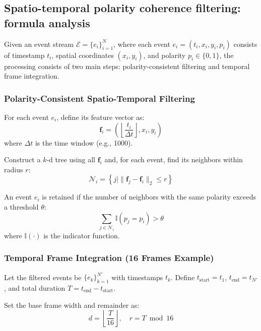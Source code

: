 \documentclass[conference]{IEEEtran}
\begin{document}
\subsection{Spatio-temporal polarity coherence filtering: formula analysis}
Given an event stream $\mathcal{E} = \{e_i\}_{i=1}^N$, where each event $e_i = (t_i, x_i, y_i, p_i)$ consists of timestamp $t_i$, spatial coordinates $(x_i, y_i)$, and polarity $p_i \in \{0, 1\}$, the processing consists of two main steps: polarity-consistent filtering and temporal frame integration.

\subsubsection{Polarity-Consistent Spatio-Temporal Filtering}

For each event $e_i$, define its feature vector as:
\begin{equation}
\mathbf{f}_i = \left( \left\lfloor \frac{t_i}{\Delta t} \right\rfloor, x_i, y_i \right)
\end{equation}
where $\Delta t$ is the time window (e.g., 1000).

Construct a $k$-d tree using all $\mathbf{f}_i$ and, for each event, find its neighbors within radius $r$:
\begin{equation}
\mathcal{N}_i = \left\{ j \mid \|\mathbf{f}_j - \mathbf{f}_i\|_2 \leq r \right\}
\end{equation}

An event $e_i$ is retained if the number of neighbors with the same polarity exceeds a threshold $\theta$:
\begin{equation}
\sum_{j \in \mathcal{N}_i} \mathbb{I}(p_j = p_i) > \theta
\end{equation}
where $\mathbb{I}(\cdot)$ is the indicator function.

\subsubsection{Temporal Frame Integration (16 Frames Example)}

Let the filtered events be $\{e_k\}_{k=1}^{N'}$ with timestamps $t_k$. Define $t_{\text{start}} = t_1$, $t_{\text{end}} = t_{N'}$, and total duration $T = t_{\text{end}} - t_{\text{start}}$.

Set the base frame width and remainder as:
\begin{equation}
d = \left\lfloor \frac{T}{16} \right\rfloor, \quad r = T \bmod 16
\end{equation}
\end{document}
